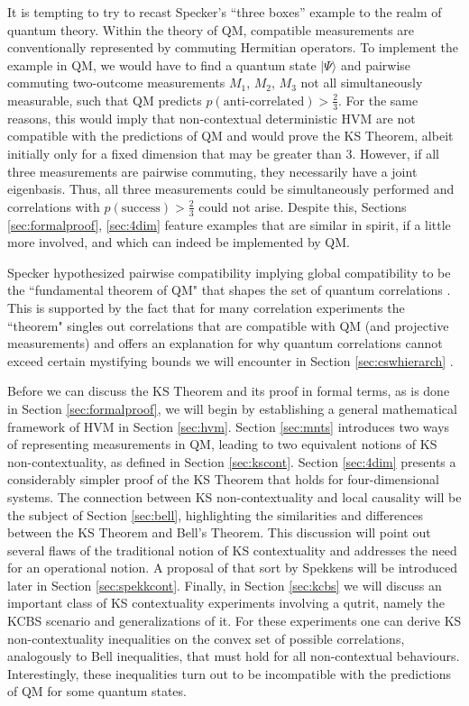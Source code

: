 It is tempting to try to recast Specker's “three boxes” example to the realm of quantum theory. Within the theory of QM, compatible measurements are conventionally represented by commuting Hermitian operators. To implement the example in QM, we would have to find a quantum state $|\Psi\rangle$ and pairwise commuting two-outcome measurements $M_{1}$, $M_{2}$, $M_{3}$ not all simultaneously measurable, such that QM predicts $p(\text{anti-correlated})>\frac{2}{3}$. For the same reasons, this would imply that non-contextual deterministic HVM are not compatible with the predictions of QM and would prove the KS Theorem, albeit initially only for a fixed dimension that may be greater than 3. However, if all three measurements are pairwise commuting, they necessarily have a joint eigenbasis. Thus, all three measurements could be simultaneously performed and correlations with $p(\text{success})>\frac{2}{3}$ could not arise. Despite this, Sections \ref{sec:formalproof}, \ref{sec:4dim} feature examples that are similar in spirit, if a little more involved, and which can indeed be implemented by QM.

Specker hypothesized pairwise compatibility implying global compatibility to be the ``fundamental theorem of QM" that shapes the set of quantum correlations \cite{Cabello2012}. This is supported by the fact that for many correlation experiments the ``theorem" singles out correlations that are compatible with QM (and projective measurements) and offers an explanation for why quantum correlations cannot exceed certain mystifying bounds we will encounter in Section \ref{sec:cswhierarch} \cite{Cabello2013}.

Before we can discuss the KS Theorem and its proof in formal terms, as is done in Section \ref{sec:formalproof}, we will begin by establishing a general mathematical framework of HVM in Section \ref{sec:hvm}. Section \ref{sec:mnts} introduces two ways of representing measurements in QM, leading to two equivalent notions of KS non-contextuality, as defined in Section \ref{sec:kscont}. Section \ref{sec:4dim} presents a considerably simpler proof of the KS Theorem that holds for four-dimensional systems. The connection between KS non-contextuality and local causality will be the subject of Section \ref{sec:bell}, highlighting the similarities and differences between the KS Theorem and Bell's Theorem. This discussion will point out several flaws of the traditional notion of KS contextuality and addresses the need for an operational notion. A proposal of that sort by Spekkens will be introduced later in Section \ref{sec:spekkcont}. Finally, in Section \ref{sec:kcbs} we will discuss an important class of KS contextuality experiments involving a qutrit, namely the KCBS scenario and generalizations of it. For these experiments one can derive KS non-contextuality inequalities on the convex set of possible correlations, analogously to Bell inequalities, that must hold for all non-contextual behaviours. Interestingly, these inequalities turn out to be incompatible with the predictions of QM for some quantum states.

